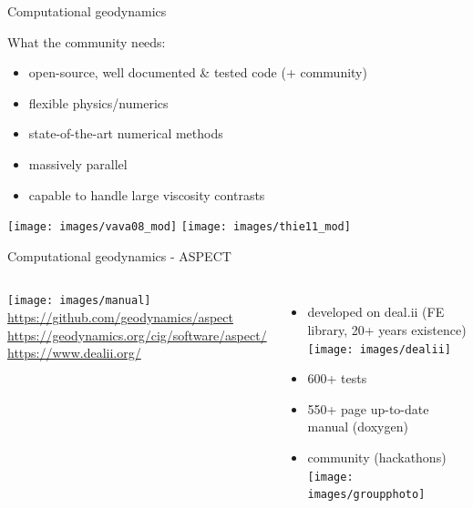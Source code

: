 \documentclass[handout]{beamer}
\begin{document}
\begin{frame}[plain]{Computational geodynamics}

What the community needs:
\begin{itemize}
\item open-source, well documented \& tested code (+ community)
\item flexible physics/numerics
\item state-of-the-art numerical methods
\item massively parallel
\pause
\item capable to handle large viscosity contrasts
\end{itemize}

\texttt{[image: images/vava08\_mod]}
\texttt{[image: images/thie11\_mod]}




\end{frame}

\begin{frame}[plain]{Computational geodynamics - ASPECT }
\begin{columns}[onlytextwidth]
\texttt{[image: images/manual]}\\
{\tiny \url{https://github.com/geodynamics/aspect}}\\
{\tiny \url{https://geodynamics.org/cig/software/aspect/}}\\
{\tiny \url{https://www.dealii.org/}}
\begin{itemize}
\item developed on deal.ii (FE library, 20+ years existence)\\
\texttt{[image: images/dealii]}
\item 600+ tests
\item 550+ page up-to-date manual (doxygen)
\item community (hackathons)\\
\texttt{[image: images/groupphoto]}
\end{itemize}
\end{columns}
\end{frame}
\end{document}
